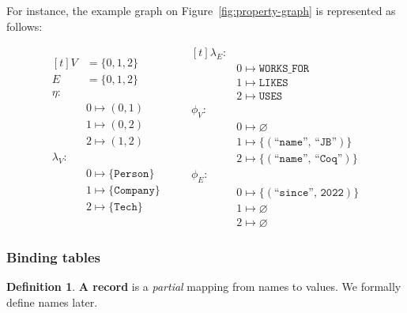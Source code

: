 \documentclass[14pt]{constructor-thesis}
\theoremstyle{definition}
\newtheorem*{definition}{Definition}
\begin{document}
For instance, the example graph on Figure~\ref{fig:property-graph} is represented as follows:

\begin{equation*}
  \begin{aligned}[t]
    V &= \{0, 1, 2 \} \\
    E &= \{0, 1, 2 \} \\
    \eta: & \\
          & 0 \mapsto (0, 1) \\
          & 1 \mapsto (0, 2) \\
          & 2 \mapsto (1, 2) \\
    \lambda_V: & \\
          & 0 \mapsto \{\texttt{Person}\} \\
          & 1 \mapsto \{\texttt{Company}\} \\
          & 2 \mapsto \{\texttt{Tech}\} \\
  \end{aligned}
  \qquad
  \begin{aligned}[t]
    \lambda_E: & \\
          & 0 \mapsto \texttt{WORKS\_FOR} \\
          & 1 \mapsto \texttt{LIKES} \\
          & 2 \mapsto \texttt{USES} \\
    \phi_V: & \\
          & 0 \mapsto \varnothing \\
          & 1 \mapsto \{(\texttt{``name''}, \, \texttt{``JB''})\} \\
          & 2 \mapsto \{(\texttt{``name''}, \, \texttt{``Coq''})\} \\
    \phi_E: & \\
          & 0 \mapsto \{(\texttt{``since''}, \, \texttt{2022})\} \\
          & 1 \mapsto  \varnothing \\
          & 2 \mapsto \varnothing
  \end{aligned}
\end{equation*}

\subsubsection{Binding tables}

\begin{definition}
  \textbf{A record} is a \textit{partial} mapping from names to values. We formally define names later.
\end{definition}
\end{document}
